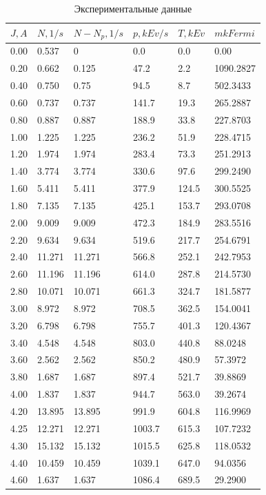 \documentclass[a4paper,12pt]{article}
\begin{document}
    \begin{table}[h!]
\centering
\caption{Экспериментальные данные}
\label{my-label}
\begin{tabular}{|l|l|l|l|l|l|}
\hline
$J, A$&	$N, 1/s$&	$N-N_p, 1/s$&	$p, kEv/s$&	$T, kEv$&	$mkFermi$ \\ \hline
0.00&	0.537&	0&	0.0&	0.0&	0.00 \\ \hline
0.20&	0.662&	0.125&	47.2&	2.2&	1090.2827 \\ \hline
0.40&	0.750&	0.75&	94.5&	8.7&	502.3433 \\ \hline
0.60&	0.737&	0.737&	141.7&	19.3&	265.2887 \\ \hline
0.80&	0.887&	0.887&	188.9&	33.8&	227.8703 \\ \hline
1.00&	1.225&	1.225&	236.2&	51.9&	228.4715 \\ \hline
1.20&	1.974&	1.974&	283.4&	73.3&	251.2913 \\ \hline
1.40&	3.774&	3.774&	330.6&	97.6&	299.2490 \\ \hline
1.60&	5.411&	5.411&	377.9&	124.5&	300.5525 \\ \hline
1.80&	7.135&	7.135&	425.1&	153.7&	293.0708 \\ \hline
2.00&	9.009&	9.009&	472.3&	184.9&	283.5516 \\ \hline
2.20&	9.634&	9.634&	519.6&	217.7&	254.6791 \\ \hline
2.40&	11.271&	11.271&	566.8&	252.1&	242.7953 \\ \hline
2.60&	11.196&	11.196&	614.0&	287.8&	214.5730 \\ \hline
2.80&	10.071&	10.071&	661.3&	324.7&	181.5877 \\ \hline
3.00&	8.972&	8.972&	708.5&	362.5&	154.0041 \\ \hline
3.20&	6.798&	6.798&	755.7&	401.3&	120.4367 \\ \hline
3.40&	4.548&	4.548&	803.0&	440.8&	88.0248 \\ \hline
3.60&	2.562&	2.562&	850.2&	480.9&	57.3972 \\ \hline
3.80&	1.687&	1.687&	897.4&	521.7&	39.8869 \\ \hline
4.00&	1.837&	1.837&	944.7&	563.0&	39.2674 \\ \hline
4.20&	13.895&	13.895&	991.9&	604.8&	116.9969 \\ \hline
4.25&	12.271&	12.271&	1003.7&	615.3&	107.7232 \\ \hline
4.30&	15.132&	15.132&	1015.5&	625.8&	118.0532 \\ \hline
4.40&	10.459&	10.459&	1039.1&	647.0&	94.0356 \\ \hline
4.60&	1.637&	1.637&	1086.4&	689.5&	29.2900 \\ \hline
\end{tabular}
\end{table}
\end{document}
